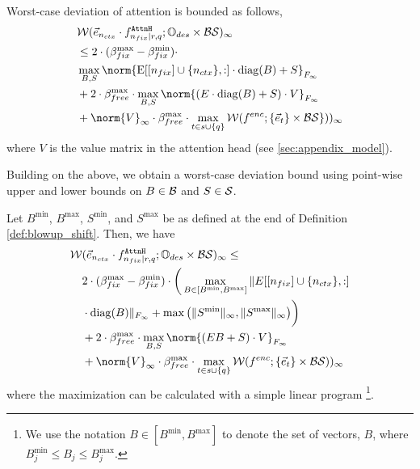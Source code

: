 \begin{lemma}
	\label{lem:att_bound}
	Worst-case deviation of attention is bounded as follows,
	\begin{align*}
		&\WD(\vecNctx \cdot f^{\attnH}_{\ndes \mid r, q} ; \InpSpace \times \blowupSet \shiftSet)_\infty
	     \\ &\leq
	     2 \cdot (\ssMaxRB - \ssMinRB) \cdot \\
         &\max_{B, S}\norm{\Embed[[\nfix] \cup \{\nctx\}, :] \cdot \diag(B) + S}_{\frobInf} \\
		&+ 2 \cdot \ssMaxFB \cdot \max_{B, S} \norm{(E \cdot \diag(B) + S) \cdot V}_{\frobInf}\\
		&+ \norm{V}_\infty \cdot \ssMaxFB \cdot \max_{t \in s \cup \{q\}} \WD(\fenc; \{\vece_t \} \times \blowupSet \shiftSet\}))_\infty
	\end{align*}
        where $V$ is the value matrix in the attention head (see \cref{sec:appendix_model}).
\end{lemma}

Building on the above, we obtain a worst-case deviation bound using point-wise upper and lower bounds on $B \in \mathcal{B}$ and $S \in \mathcal{S}$.


\begin{corollary} \label{cor:Bmax} 
	Let $B^{\min} $, $B^{\max}$, $S^{\min}$, and $S^{\max}$ be as defined at the end of Definition \ref{def:blowup_shift}.
	Then, we have
	\begin{align*}
		\WD&(\vecNctx \cdot f^{\attnH}_{\ndes \mid r, q} ; \InpSpace \times \blowupSet \shiftSet)_\infty \leq  \\
		   & 2 \cdot (\ssMaxRB - \ssMinRB) \cdot \bigg(\max_{B \in [B^{\min}, B^{\max}]} \|E[[\nfix] \cup \{\nctx\}, :] \\
		   &\cdot \diag(B)\|_{\frobInf}  
	   + \max\big(\|{S^{\min}}\|_\infty, \|{S^{\max}}\|_\infty \big)\bigg) \\
		   &+ 2 \cdot \ssMaxFB \cdot \max_{B, S} \norm{(E B + S) \cdot V}_{\frobInf} \\
		   &+ \norm{V}_\infty \cdot \ssMaxFB \cdot \max_{t \in s \cup \{q\}} \WD(\fenc; \{\vece_t\} \times \blowupSet \shiftSet))_\infty
	\end{align*}
	where the maximization can be calculated with a simple linear program
    \footnote{
        We use the notation $B \in [B^{\min}, B^{\max}]$ to denote the set of vectors, $B$, where $B_j^{\min} \leq B_j \leq B_j^{\max}$.
    }.
\end{corollary}


